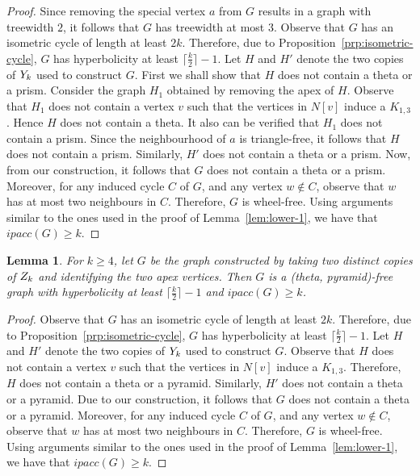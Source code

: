 \documentclass[a4paper]{article}
\newcommand{\ipac}[1]{ipacc\left(#1\right)}
\newtheorem{lemma}[theorem]{Lemma}
\begin{document}
 \begin{proof}
 Since removing the special vertex $a$ from $G$ results in a graph with treewidth $2$, it follows that $G$ has treewidth at most $3$. Observe that $G$ has an isometric cycle of length at least $2k$. Therefore, due to Proposition~\ref{prp:isometric-cycle}, $G$ has hyperbolicity at least $\lceil\frac{k}{2}\rceil-1$. Let $H$ and $H'$ denote the two copies of $Y_{k}$ used to construct $G$. First we shall show that $H$ does not contain a theta or a prism. Consider the graph $H_1$ obtained by removing the apex of $H$. Observe that $H_1$ does not contain a vertex $v$ such that the vertices in $N[v]$ induce a $K_{1,3}$. Hence $H$ does not contain a theta. It also can be verified that $H_1$ does not contain a prism. Since the neighbourhood of $a$ is triangle-free, it follows that $H$ does not contain a prism. Similarly, $H'$ does not contain a theta or a prism. Now, from our construction, it follows that $G$ does not contain a theta or a prism.  Moreover, for any induced cycle $C$ of $G$, and any vertex $w\notin C$, observe that $w$ has at most two neighbours in $C$. Therefore, $G$ is wheel-free. Using arguments similar to the ones used in the proof of Lemma~\ref{lem:lower-1}, we have that $\ipac{G} \geq k$.   
 \end{proof}






\begin{lemma}\label{lem:lower-3}
For $k\geq 4$, let $G$ be the graph constructed by taking two distinct copies of $Z_{k}$ and identifying the two apex vertices. Then $G$ is a (theta, pyramid)-free graph with hyperbolicity at least $\lceil\frac{k}{2}\rceil-1$ and $\ipac{G} \geq k$.
\end{lemma}

 \begin{proof}
 Observe that $G$ has an isometric cycle of length at least $2k$. Therefore, due to Proposition~\ref{prp:isometric-cycle}, $G$ has hyperbolicity at least $\lceil\frac{k}{2}\rceil-1$. Let $H$ and $H'$ denote the two copies of $Y_{k}$ used to construct $G$. Observe that $H$ does not contain a vertex $v$ such that the vertices in $N[v]$ induce a $K_{1,3}$. Therefore, $H$ does not contain a theta or a pyramid.  Similarly, $H'$ does not contain a theta or a pyramid. Due to our construction, it follows that $G$ does not contain a theta or a pyramid. Moreover, for any induced cycle $C$ of $G$, and any vertex $w\notin C$, observe that $w$ has at most two neighbours in $C$. Therefore, $G$ is wheel-free. Using arguments similar to the ones used in the proof of Lemma~\ref{lem:lower-1}, we have that $\ipac{G} \geq k$.
 \end{proof}
\end{document}
